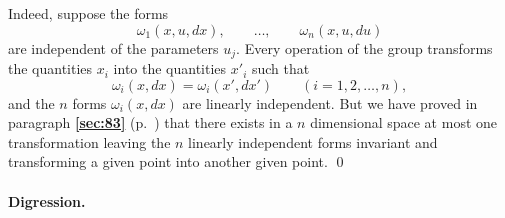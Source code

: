 \documentclass[leqno,11pt]{book}
\numberwithin{equation}{chapter}
\theoremstyle{shape1}
\theoremstyle{shapesmall}
\newcommand{\fsref}[1]{{\rm\textsection\textbf{\ref{sec:#1}}}}
\newcommand{\somespace}{\vspace{9pt}}
\begin{document}
\somespace

Indeed, suppose the forms
\[
\omega_{1}(x,u,dx),\qquad\dots,\qquad \omega_{n}(x,u,du)
\]
are independent of the parameters $u_{j}$. Every operation of the group transforms the quantities $x_{i}$ into the quantities $x'_{i}$ such that
\[
\omega_{i}(x,dx)=\omega_{i}(x',dx')\qquad(i=1,2,\dots,n),
\]
and the $n$ forms $\omega_{i}(x,dx)$ are linearly independent. But we have proved in paragraph \fsref{83} (p.~\pageref{sec:83}) that there exists in a $n$ dimensional space at most one transformation leaving the $n$ linearly independent forms invariant and transforming a given point into another given point.
\qed

\paragraph{Digression.}
\label{sec:111}
\end{document}
